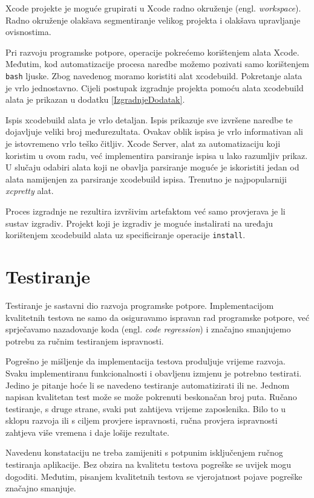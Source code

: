 \documentclass[times, utf8, diplomski, numeric]{fer}
\newcommand{\eng}[1]{(engl. \textit{#1})}
\begin{document}
Xcode projekte je moguće grupirati u Xcode radno okruženje \eng{workspace}. Radno okruženje olakšava segmentiranje velikog projekta i olakšava upravljanje ovisnostima.

Pri razvoju programske potpore, operacije pokrećemo korištenjem alata Xcode. Međutim, kod automatizacije procesa naredbe možemo pozivati samo korištenjem \verb|bash| ljuske. Zbog navedenog moramo koristiti alat xcodebuild. Pokretanje alata je vrlo jednostavno. Cijeli postupak izgradnje projekta pomoću alata xcodebuild alata je prikazan u dodatku \ref{IzgradnjeDodatak}.

Ispis xcodebuild alata je vrlo detaljan. Ispis prikazuje sve izvršene naredbe te dojavljuje veliki broj međurezultata. Ovakav oblik ispisa je vrlo informativan ali je istovremeno vrlo teško čitljiv. Xcode Server, alat za automatizaciju koji koristim u ovom radu, već implementira parsiranje ispisa u lako razumljiv prikaz. U slučaju odabiri alata koji ne obavlja parsiranje  moguće je iskoristiti jedan od alata namijenjen za parsiranje xcodebuild ispisa. Trenutno je najpopularniji \textit{xcpretty} alat\citep{xcpretty}.

Proces izgradnje ne rezultira izvršivim artefaktom već samo provjerava je li sustav izgradiv. Projekt koji je izgradiv je moguće instalirati na uređaju korištenjem xcodebuild alata uz specificiranje operacije \verb|install|.

\section{Testiranje}

Testiranje je sastavni dio razvoja programske potpore. Implementacijom kvalitetnih testova ne samo da osiguravamo ispravan rad programske potpore, već sprječavamo nazadovanje koda \eng{code regression} i značajno smanjujemo potrebu za ručnim testiranjem ispravnosti\citep{wiki:SoftwareTesting}.

Pogrešno je mišljenje da implementacija testova produljuje vrijeme razvoja. Svaku implementiranu funkcionalnosti i obavljenu izmjenu je potrebno testirati. Jedino je pitanje hoće li se navedeno testiranje automatizirati ili ne. Jednom napisan kvalitetan test može se može pokrenuti beskonačan broj puta. Ručano testiranje, s druge strane, svaki put zahtijeva vrijeme zaposlenika. Bilo to u sklopu razvoja ili s ciljem provjere ispravnosti, ručna provjera ispravnosti zahtjeva više vremena i daje lošije rezultate.

Navedenu konstataciju ne treba zamijeniti s potpunim isključenjem ručnog testiranja aplikacije. Bez obzira na kvalitetu testova pogreške se uvijek mogu dogoditi. Međutim, pisanjem kvalitetnih testova se vjerojatnost pojave pogreške značajno smanjuje.
\end{document}
